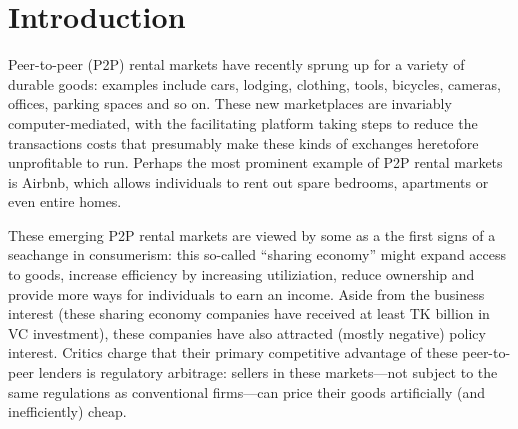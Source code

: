 \documentclass[11pt]{article}
\begin{document}




\section{Introduction}
Peer-to-peer (P2P) rental markets have recently sprung up for a variety of durable goods:
examples include cars, lodging, clothing, tools, bicycles, cameras, offices, parking spaces and so on.
These new marketplaces are invariably computer-mediated, with the facilitating platform taking steps to reduce the transactions costs that presumably make these kinds of exchanges heretofore unprofitable to run. 
Perhaps the most prominent example of P2P rental markets is Airbnb, which allows individuals to rent out spare bedrooms, apartments or even entire homes.
 
These emerging P2P rental markets are viewed by some as a the first signs of a seachange in consumerism: 
this so-called ``sharing economy'' might expand access to goods, increase efficiency by increasing utiliziation, reduce ownership and provide more ways for individuals to earn an income. 
Aside from the business interest (these sharing economy companies have received at least TK billion in VC investment), these companies have also attracted (mostly negative) policy interest. 
Critics charge that their primary competitive advantage of these peer-to-peer lenders is regulatory arbitrage: 
sellers in these markets---not subject to the same regulations as conventional firms---can price their goods artificially (and inefficiently) cheap. 

\end{document}
